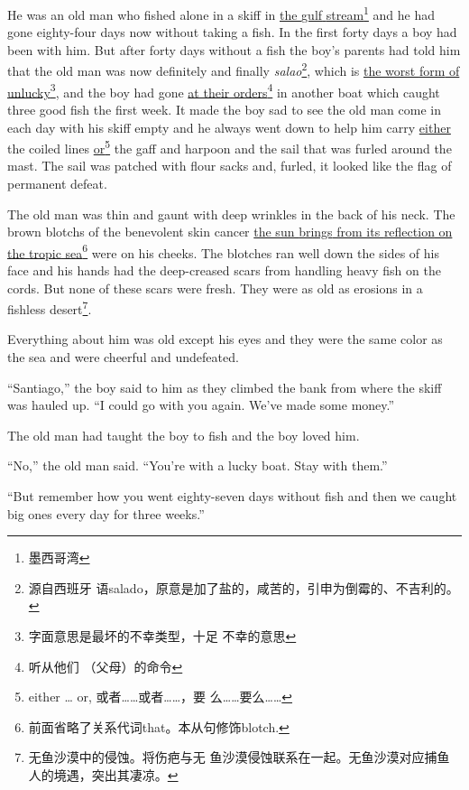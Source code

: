 \documentclass[fontset=ubuntu,zihao=-4]{ctexrep}
\begin{document}
He was an old man who fished alone in a \gls{skiff} in \uline{the \Gls{gulf}
  \Gls{stream}}\footnote{墨西哥湾} and he had gone eighty-four days now without
taking a fish. In the first forty days a boy had been with him. But after
forty days without a fish the boy's parents had told him that the old man
was now \gls{definitely} and finally \emph{salao}\footnote{源自西班牙
  语salado，原意是加了盐的，咸苦的，引申为倒霉的、不吉利的。}, which is
\uline{the worst \gls{form} of unlucky}\footnote{字面意思是最坏的不幸类型，十足
  不幸的意思}, and the boy had gone \uline{at their orders}\footnote{听从他们
  （父母）的命令} in another boat which caught three good fish the first
week. It made the boy sad to see the old man come in each day with his
skiff empty and he always went down to help him carry \uline{either} the
\gls{coiled} lines \uline{or}\footnote{either \ldots{} or, 或者……或者……，要
  么……要么……} the \gls{gaff} and \gls{harpoon} and the \gls{sail} that was
\gls{furled} around the \gls{mast}. The sail was patched with \gls{flour}
\glspl{sack} and, \gls{furled}, it looked like the flag of \gls{permanent} \gls{defeat}.

The old man was thin and \gls{gaunt} with deep \glspl{wrinkle} in the back
of his neck. The brown \glspl{blotch} of the \gls{benevolent} \gls{skin}
cancer \uline{the sun \glspl{bring} from its \gls{reflection} on the
  \gls{tropic} sea}\footnote{前面省略了关系代词that。本从句修饰blotch.} were
on his \glspl{cheek}. The blotches ran well down the sides of his face and his
hands had the \gls{deep-creased} \glspl{scar} from handling heavy fish on
the \glspl{cord}. But none of these scars were fresh. They were \gls{as} old
as \glspl{erosion} in a fishless desert\footnote{无鱼沙漠中的侵蚀。将伤疤与无
  鱼沙漠侵蚀联系在一起。无鱼沙漠对应捕鱼人的境遇，突出其凄凉。}.

Everything about him was old \gls{except} his eyes and they were the same
color as the sea and were \gls{cheerful} and \gls{undefeated}.

``Santiago,'' the boy said to him as they climbed the \gls{bank} from where the
skiff was \gls{hauled} up. ``I could go with you again. We've made some money.''

The old man had taught the boy to fish and the boy loved him.

``No,'' the old man said. ``You're with a lucky boat. Stay with them.''

``But remember how you went eighty-seven days without fish and then we caught big ones every day for three weeks.''
\end{document}
